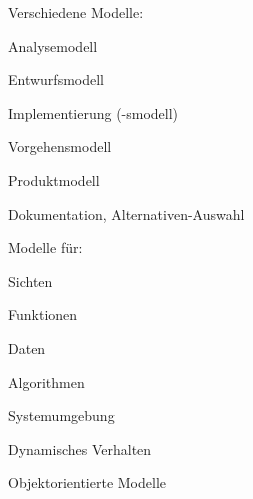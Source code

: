 \documentclass[a4paper]{article}
\begin{document}
\begin{multicols}{3}
  Verschiedene Modelle:
  \begin{itemize*}
    \item Analysemodell
    \item Entwurfsmodell
    \item Implementierung (-smodell)
    \item Vorgehensmodell
    \item Produktmodell
    \item Dokumentation, Alternativen-Auswahl
  \end{itemize*}

  Modelle für:
  \begin{itemize*}
    \item Sichten
    \item Funktionen
    \item Daten
    \item Algorithmen
    \item Systemumgebung
    \item Dynamisches Verhalten
    \item Objektorientierte Modelle
  \end{itemize*}


\end{multicols}
\end{document}
